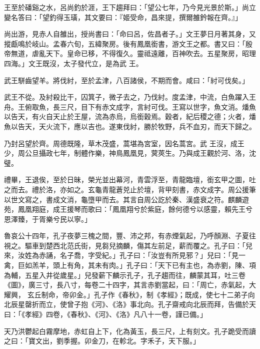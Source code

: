 \begin{pinyinscope}
 王至於磻谿之水，呂尚釣於涯，王下趨拜曰：「望公七年，乃今見光景於斯。」尚立變名答曰：「望釣得玉璜，其文要曰：『姬受命，昌來提，撰爾雒鈐報在齊。』」



 尚出游，見赤人自雒出，授尚書曰：「命曰呂，佐昌者子。」文王夢日月著其身，又摐甗鳴於岐山。孟春六旬，五緯聚房。後有鳳凰銜書，游文王之都。書又曰：「殷帝無道，虐亂天下。皇命已移，不得復久。靈祗遠離，百神吹去。五星聚房，昭理四海。」文王既沒，太子發代立，是為武
 王。



 武王駢齒望羊。將伐紂，至於孟津，八百諸侯，不期而會。咸曰：「紂可伐矣。」



 武王不從。及紂殺比干，囚箕子，微子去之，乃伐紂。度孟津，中流，白魚躍入王舟。王俯取魚，長三尺，目下有赤文成字，言紂可伐。王寫以世字，魚文消。燔魚以告天，有火自天止於王屋，流為赤烏，烏銜穀焉。穀者，紀后稷之德；火者，燔魚以告天，天火流下，應以吉也。遂東伐紂，勝於牧野，兵不血刃，而天下歸之。



 乃封呂望於齊。周德既隆，草木茂盛，蒿堪為宮室，因名蒿宮。武
 王沒，成王少，周公旦攝政七年，制體作樂，神鳥鳳凰見，蓂莢生。乃與成王觀於河、洛，沈璧。



 禮畢，王退俟，至於日昧，榮光並出幕河，青雲浮至，青龍臨壇，銜玄甲之圖，吐之而去。禮於洛，亦如之。玄龜青龍蒼兕止於壇，背甲刻書，赤文成字。周公援筆以世文寫之，書成文消，龜墮甲而去。其言自周公訖於秦、漢盛衰之符。麒麟遊苑，鳳凰翔庭，成王援琴而歌曰：「鳳凰翔兮於紫庭，餘何德兮以感靈，賴先王兮恩澤臻，于胥樂兮民以寧。」



 魯哀公十四年，孔子夜夢三槐之間，豐、沛之邦，有赤煙氣起，乃呼顏淵、子夏往視之。驅車到楚西北范氏街，見芻兒摘麟，傷其左前足，薪而覆之。孔子曰：「兒來，汝姓為赤誦，名子喬，字受紀。」孔子曰：「汝豈有所見邪？」兒曰：「見一禽，巨如羔羊，頭上有角，其未有肉。」孔子曰：「天下已有主也，為赤劉，陳、項為輔，五星入井從歲星。」兒發薪下麟示孔子，孔子趨而往，麟蒙其耳，吐三卷《圖》，廣三寸，長八寸，每卷二十四字，其言赤劉當起，曰：「周亡，赤氣起，大耀興，
 玄丘制命，帝卯金。」孔子作《春秋》，制《孝經》；既成，使七十二弟子向北辰星罄折而立，使曾子抱《河》、《洛》事北向。孔子齋戒向北辰而拜，告備於天曰：「《孝經》四卷，《春秋》、《河》、《洛》凡八十一卷，謹已備。」



 天乃洪鬱起白霧摩地，赤虹自上下，化為黃玉，長三尺，上有刻文。孔子跪受而讀之曰：「寶文出，劉季握。卯金刀，在軫北。字禾子，天下服。」




\end{pinyinscope}
